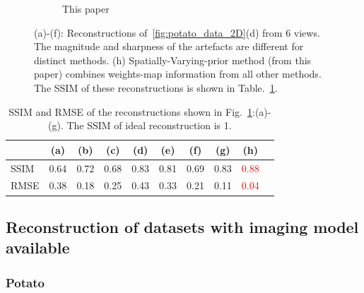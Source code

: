 \documentclass[journal]{IEEEtran}
\begin{document}
\begin{figure}[!h]
\begin{subfigure}[b]{0.24\linewidth}
        \caption{This paper}
     \end{subfigure}
      \caption{(a)-(f): Reconstructions of~\ref{fig:potato_data_2D}(d)
        from $6$ views. The magnitude and sharpness of the artefacts
        are different for distinct methods. (h)
        Spatially-Varying-prior method (from this paper) combines
        weights-map information from all other methods. The SSIM of
        these reconstructions is shown in
        Table.~\ref{table:potato_2D_ssim}.}
\label{fig:reconstructions_diff_methods}
\end{figure}
\begin{table}[!h]
  \centering
\caption{SSIM and RMSE of the reconstructions shown in Fig.~\ref{fig:reconstructions_diff_methods}:(a)-(g). The SSIM of ideal reconstruction is 1.}
\begin{tabular}{|l|c|c|c|c|c|c|c|c|c|}
\hline
 & \textbf{(a)} & \textbf{(b)} & \textbf{(c)} & \textbf{(d)} & \textbf{(e)} & \textbf{(f)} &  \textbf{(g)} &  \textbf{(h)} \\\hline
SSIM & 0.64 & 0.72  & 0.68 & 0.83 & 0.81 & 0.69 & 0.83 &\textcolor{red}{0.88} \\ \hline
RMSE & 0.38 & 0.18 & 0.25 & 0.43 & 0.33 & 0.21 & 0.11 & \textcolor{red}{0.04}\\ \hline
\end{tabular}
\label{table:potato_2D_ssim}
\end{table}

\subsection{Reconstruction of datasets with imaging model available}
\subsubsection{\textbf{Potato}}
\label{Sec:potato_spatially_varying}
\end{document}
